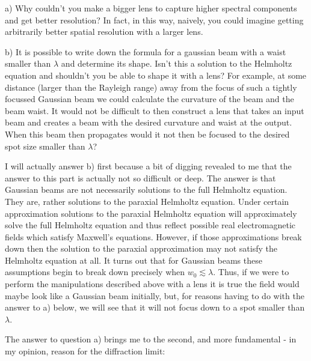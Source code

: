 \documentclass[12pt]{article}
\begin{document}
a) Why couldn't you make a bigger lens to capture higher spectral components and get better resolution? In fact, in this way, naively, you could imagine getting arbitrarily better spatial resolution with a larger lens.

b) It is possible to write down the formula for a gaussian beam with a waist smaller than $\lambda$ and determine its shape. Isn't this a solution to the Helmholtz equation and shouldn't you be able to shape it with a lens? For example, at some distance (larger than the Rayleigh range) away from the focus of such a tightly focussed Gaussian beam we could calculate the curvature of the beam and the beam waist. It would not be difficult to then construct a lens that takes an input beam and creates a beam with the desired curvature and waist at the output. When this beam then propagates would it not then be focused to the desired spot size smaller than $\lambda$?

I will actually answer b) first because a bit of digging revealed to me that the answer to this part is actually not so difficult or deep. The answer is that Gaussian beams are not necessarily solutions to the full Helmholtz equation. They are, rather solutions to the paraxial Helmholtz equation. Under certain approximation solutions to the paraxial Helmholtz equation will approximately solve the full Helmholtz equation and thus reflect possible real electromagnetic fields which satisfy Maxwell's equations. However, if those approximations break down then the solution to the paraxial approximation may not satisfy the Helmholtz equation at all. It turns out that for Gaussian beams these assumptions begin to break down precisely when $w_0 \lesssim \lambda$. Thus, if we were to perform the manipulations described above with a lens it is true the field would maybe look like a Gaussian beam initially, but, for reasons having to do with the answer to a) below, we will see that it will not focus down to a spot smaller than $\lambda$.

The answer to question a) brings me to the second, and more fundamental - in my opinion, reason for the diffraction limit:
\end{document}

